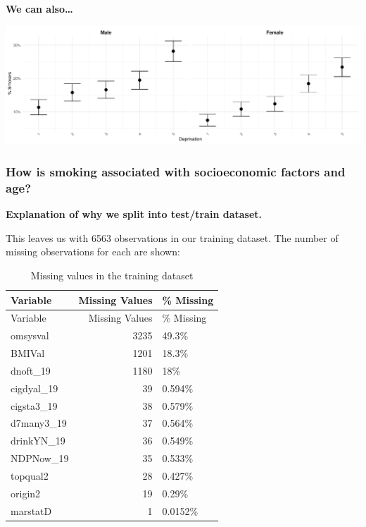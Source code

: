 \documentclass[
  11pt,
]{article}
\begin{document}
\textbf{We can also\ldots{}}

\includegraphics{Coursework_files/figure-latex/output prevelance plot-1.pdf}\\

\hypertarget{how-is-smoking-associated-with-socioeconomic-factors-and-age}{%
\subsubsection{How is smoking associated with socioeconomic factors and
age?}\label{how-is-smoking-associated-with-socioeconomic-factors-and-age}}

\textbf{Explanation of why we split into test/train dataset.}

This leaves us with 6563 observations in our training dataset. The
number of missing observations for each are shown:

\begin{longtable}[]{@{}lrl@{}}
\caption{Missing values in the training dataset}\tabularnewline
\toprule()
Variable & Missing Values & \% Missing \\
\midrule()
\endfirsthead
\toprule()
Variable & Missing Values & \% Missing \\
\midrule()
\endhead
omsysval & 3235 & 49.3\% \\
BMIVal & 1201 & 18.3\% \\
dnoft\_19 & 1180 & 18\% \\
cigdyal\_19 & 39 & 0.594\% \\
cigsta3\_19 & 38 & 0.579\% \\
d7many3\_19 & 37 & 0.564\% \\
drinkYN\_19 & 36 & 0.549\% \\
NDPNow\_19 & 35 & 0.533\% \\
topqual2 & 28 & 0.427\% \\
origin2 & 19 & 0.29\% \\
marstatD & 1 & 0.0152\% \\
\bottomrule()
\end{longtable}
\end{document}
